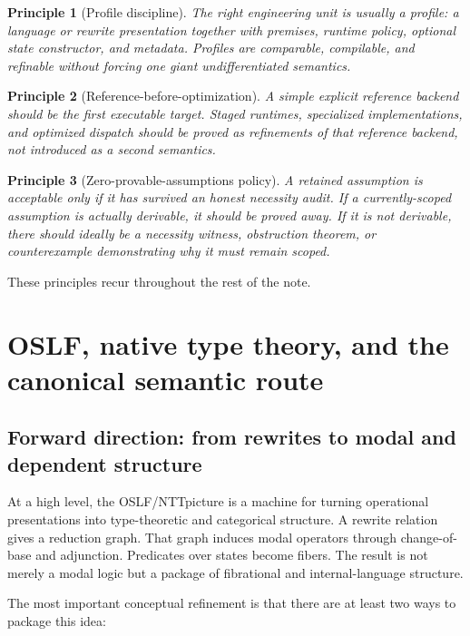 \documentclass[11pt]{article}
\newtheorem{principle}{Principle}
\newcommand{\OSLF}{OSLF}
\newcommand{\NTT}{NTT}
\begin{document}
\begin{principle}[Profile discipline]
The right engineering unit is usually a \emph{profile}: a language or rewrite presentation together with premises, runtime policy, optional state constructor, and metadata. Profiles are comparable, compilable, and refinable without forcing one giant undifferentiated semantics.
\end{principle}

\begin{principle}[Reference-before-optimization]
A simple explicit reference backend should be the first executable target. Staged runtimes, specialized implementations, and optimized dispatch should be proved as refinements of that reference backend, not introduced as a second semantics.
\end{principle}

\begin{principle}[Zero-provable-assumptions policy]
A retained assumption is acceptable only if it has survived an honest necessity audit. If a currently-scoped assumption is actually derivable, it should be proved away. If it is not derivable, there should ideally be a necessity witness, obstruction theorem, or counterexample demonstrating why it must remain scoped.
\end{principle}

These principles recur throughout the rest of the note.

\section{\OSLF, native type theory, and the canonical semantic route}

\subsection{Forward direction: from rewrites to modal and dependent structure}

At a high level, the \OSLF/\NTT picture is a machine for turning operational presentations into type-theoretic and categorical structure. A rewrite relation gives a reduction graph. That graph induces modal operators through change-of-base and adjunction. Predicates over states become fibers. The result is not merely a modal logic but a package of fibrational and internal-language structure.

The most important conceptual refinement is that there are at least two ways to package this idea:
\end{document}
